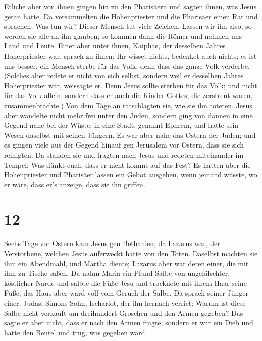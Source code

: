  Etliche aber von ihnen gingen hin zu den Pharisäern und
sagten ihnen, was Jesus getan hatte.  Da versammelten die
Hohenpriester und die Pharisäer einen Rat und sprachen: Was tun wir?
Dieser Mensch tut viele Zeichen.  Lassen wir ihn also, so
werden sie alle an ihn glauben; so kommen dann die Römer und nehmen uns
Land und Leute.  Einer aber unter ihnen, Kaiphas, der
desselben Jahres Hoherpriester war, sprach zu ihnen: Ihr wisset nichts,
 bedenket auch nichts; es ist uns besser, ein Mensch
sterbe für das Volk, denn dass das ganze Volk verderbe. 
(Solches aber redete er nicht von sich selbst, sondern weil er desselben
Jahres Hoherpriester war, weissagte er. Denn Jesus sollte sterben für
das Volk;  und nicht für das Volk allein, sondern dass er
auch die Kinder Gottes, die zerstreut waren, zusammenbrächte.)
 Von dem Tage an ratschlagten sie, wie sie ihn töteten.
 Jesus aber wandelte nicht mehr frei unter den Juden,
sondern ging von dannen in eine Gegend nahe bei der Wüste, in eine
Stadt, genannt Ephrem, und hatte sein Wesen daselbst mit seinen Jüngern.
 Es war aber nahe das Ostern der Juden; und es gingen
viele aus der Gegend hinauf gen Jerusalem vor Ostern, dass sie sich
reinigten.  Da standen sie und fragten nach Jesus und
redeten miteinander im Tempel: Was dünkt euch, dass er nicht kommt auf
das Fest?  Es hatten aber die Hohenpriester und Pharisäer
lassen ein Gebot ausgehen, wenn jemand wüsste, wo er wäre, dass er's
anzeige, dass sie ihn griffen.

\hypertarget{section-11}{%
\section{12}\label{section-11}}

 Sechs Tage vor Ostern kam Jesus gen Bethanien, da Lazarus
war, der Verstorbene, welchen Jesus auferweckt hatte von den Toten.
 Daselbst machten sie ihm ein Abendmahl, und Martha
diente; Lazarus aber war deren einer, die mit ihm zu Tische saßen.
 Da nahm Maria ein Pfund Salbe von ungefälschter,
köstlicher Narde und salbte die Füße Jesu und trocknete mit ihrem Haar
seine Füße; das Haus aber ward voll vom Geruch der Salbe. 
Da sprach seiner Jünger einer, Judas, Simons Sohn, Ischariot, der ihn
hernach verriet:  Warum ist diese Salbe nicht verkauft um
dreihundert Groschen und den Armen gegeben?  Das sagte er
aber nicht, dass er nach den Armen fragte; sondern er war ein Dieb und
hatte den Beutel und trug, was gegeben ward.

